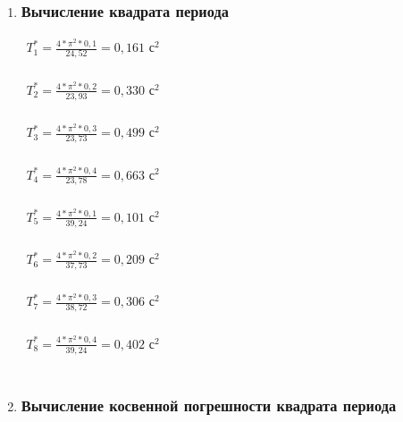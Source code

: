 \begin{enumerate}
		\item \subsubsection*{Вычисление квадрата периода}
		\label{appendix: 9}
		\begin{multicols}{2}
			\(\begin{aligned} T_1^* = \frac{4*\pi^2*0,1}{24,52} = 0,161 \text{ с}^2\end{aligned}\) \\\\
			\(\begin{aligned} T_2^* = \frac{4*\pi^2*0,2}{23,93} = 0,330 \text{ с}^2\end{aligned}\) \\\\
			\(\begin{aligned} T_3^* = \frac{4*\pi^2*0,3}{23,73} = 0,499 \text{ с}^2\end{aligned}\) \\\\
			\(\begin{aligned} T_4^* = \frac{4*\pi^2*0,4}{23,78} = 0,663 \text{ с}^2\end{aligned}\) \\\\
			\(\begin{aligned} T_5^* = \frac{4*\pi^2*0,1}{39,24} = 0,101 \text{ с}^2\end{aligned}\) \\\\
			\(\begin{aligned} T_6^* = \frac{4*\pi^2*0,2}{37,73} = 0,209 \text{ с}^2\end{aligned}\) \\\\
			\(\begin{aligned} T_7^* = \frac{4*\pi^2*0,3}{38,72} = 0,306 \text{ с}^2\end{aligned}\) \\\\
			\(\begin{aligned} T_8^* = \frac{4*\pi^2*0,4}{39,24} = 0,402 \text{ с}^2\end{aligned}\) \\\\
		\end{multicols}
		\item \subsubsection*{Вычисление косвенной погрешности квадрата периода}

\end{enumerate}
